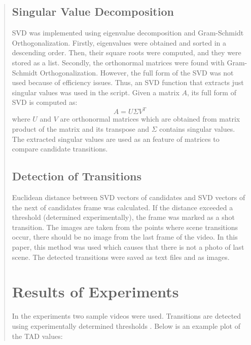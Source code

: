 \documentclass[conference]{IEEEtran}
\begin{document}
\begin{abstract}
\subsection{Singular Value Decomposition}
SVD was implemented using eigenvalue decomposition and Gram-Schmidt Orthogonalization. Firstly, eigenvalues were obtained and sorted in a descending order. Then, their square roots were computed, and they were stored as a list. Secondly, the orthonormal matrices were found with Gram-Schmidt Orthogonalization. However, the full form of the SVD was not used because of efficiency issues. Thus, an SVD function that extracts just singular values was used in the script. Given a matrix $A$, its full form of SVD is computed as:
\[
A = U \Sigma V^T
\]
where $U$ and $V$ are orthonormal matrices which are obtained from matrix product of the matrix and its transpose and $\Sigma$ contains singular values. The extracted singular values are used as an feature of matrices to compare candidate transitions.

\subsection{Detection of Transitions}
Euclidean distance between SVD vectors of candidates and SVD vectors of the next of candidates frame was calculated. If the distance exceeded a threshold (determined experimentally), the frame was marked as a shot transition. The images are taken from the points where scene transitions occur, there should be
no image from the last frame of the video. In this paper, this method was used which causes that there is not a photo of last scene. The detected transitions were saved as text files and as images.

\section{Results of Experiments}
In the experiments two sample videos were used. Transitions are detected using experimentally determined thresholds . Below is an example plot of the TAD values:


\end{abstract}
\end{document}
